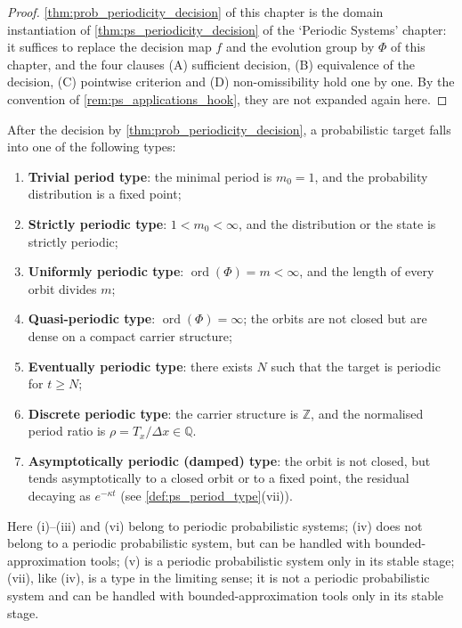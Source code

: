 \begin{proof}
\cref{thm:prob_periodicity_decision} of this chapter is the domain instantiation of \cref{thm:ps_periodicity_decision} of the `Periodic Systems' chapter:
it suffices to replace the decision map $f$ and the evolution group by $\Phi$ of this chapter, and the four clauses (A) sufficient decision, (B) equivalence of the decision, (C) pointwise criterion and (D) non-omissibility hold one by one. By the convention of \cref{rem:ps_applications_hook}, they are not expanded again here.
\end{proof}

\begin{corollary}\label{cor:prob_period_type}
After the decision by \cref{thm:prob_periodicity_decision}, a probabilistic target falls into one of the following types:
\begin{enumerate}[label=(\roman*)]
    \item \textbf{Trivial period type}: the minimal period is $m_0=1$, and the probability distribution is a fixed point;
    \item \textbf{Strictly periodic type}: $1<m_0<\infty$, and the distribution or the state is strictly periodic;
    \item \textbf{Uniformly periodic type}: $\operatorname{ord}(\Phi)=m<\infty$, and the length of every orbit divides $m$;
    \item \textbf{Quasi-periodic type}: $\operatorname{ord}(\Phi)=\infty$; the orbits are not closed but are dense on a compact carrier structure;
    \item \textbf{Eventually periodic type}: there exists $N$ such that the target is periodic for $t\ge N$;
    \item \textbf{Discrete periodic type}: the carrier structure is $\mathbb Z$, and the normalised period ratio is $\rho=T_x/\Delta x\in\mathbb Q$.
    \item \textbf{Asymptotically periodic (damped) type}: the orbit is not closed, but tends asymptotically to a closed orbit or to a fixed point, the residual decaying as $e^{-\kappa t}$ (see \cref{def:ps_period_type}(vii)).
\end{enumerate}
Here (i)--(iii) and (vi) belong to periodic probabilistic systems; (iv) does not belong to a periodic probabilistic system, but can be handled with bounded-approximation tools; (v) is a periodic probabilistic system only in its stable stage; (vii), like (iv), is a type in the limiting sense; it is not a periodic probabilistic system and can be handled with bounded-approximation tools only in its stable stage.
\end{corollary}

